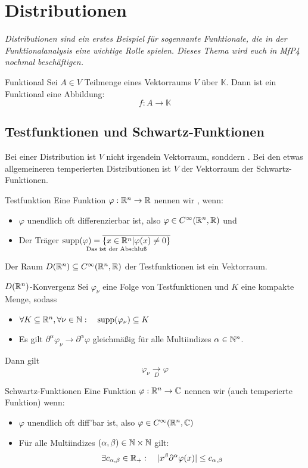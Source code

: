 \newpage
\section[Distributionen]{Distributionen}
\textit{Distributionen sind ein erstes Beispiel für sogennante Funktionale, die in der Funktionalanalysis eine wichtige Rolle spielen. Dieses Thema wird euch in MfP4 nochmal beschäftigen.}
\begin{Def}{Funktional}
Sei $A\in V$ Teilmenge eines Vektorraums $V$ über $\mathbb{K}$. Dann ist ein Funktional eine Abbildung:
$$f:A\rightarrow \mathbb{K}$$
\end{Def}
\subsection{Testfunktionen und Schwartz-Funktionen}
Bei einer Distribution ist $V$ nicht irgendein Vektorraum, sonddern . Bei den etwas allgemeineren temperierten Distributionen ist $V$ der Vektorraum der Schwartz-Funktionen.
\begin{Def}{Testfunktion}
    Eine Funktion $\varphi: \mathbb{R}^n \rightarrow \mathbb{R}$ nennen wir , wenn:
    \begin{itemize}
        \item $\varphi$ unendlich oft differenzierbar ist, also $\varphi \in C^\infty(\mathbb{R}^n, \mathbb{R})$ und
        \item Der Träger $\underset{\text{Das ist der Abschluß}}{\text{supp}(\varphi)=\overline{\{x\in\mathbb{R}^n| \varphi(x)\neq 0\}}}$
    \end{itemize}
\end{Def}
Der Raum $D(\mathbb{R}^n)\subseteq C^\infty(\mathbb{R}^n, \mathbb{R})$ der Testfunktionen ist ein Vektorraum.
\begin{Def}{$D(\mathbb{R}^n)$-Konvergenz}
    Sei $\varphi_\nu$ eine Folge von Testfunktionen und $K$ eine kompakte Menge, sodass
    \begin{itemize}
        \item $\forall K\subseteq \mathbb{R}^n, \forall \nu \in \mathbb{N}: \quad \text{supp}(\varphi_\nu)\subseteq K$
        \item Es gilt $\partial^\alpha \varphi_\nu\rightarrow \partial^\alpha \varphi$ gleichmäßig für alle Multiindizes $\alpha\in \mathbb{N}^n$.
    \end{itemize}
    Dann gilt $$\varphi_\nu \underset{D}{\rightarrow}\varphi$$
\end{Def}
\begin{Def}{Schwartz-Funktionen}
    Eine Funktion $\varphi: \mathbb{R}^n \rightarrow \mathbb{C}$ nennen wir  (auch temperierte Funktion) wenn:
    \begin{itemize}
        \item $\varphi$ unendlich oft diff'bar ist, also $\varphi\in C^\infty (\mathbb{R}^n, \mathbb{C})$
        \item Für alle Multiindizes $(\alpha, \beta)\in \mathbb{N}\times \mathbb{N}$ gilt:
        $$\exists c_{\alpha,\beta}\in \mathbb{R}_+: \quad |x^\beta \partial^\alpha \varphi(x)|\leq c_{\alpha,\beta}$$
    \end{itemize}
    
\end{Def}

